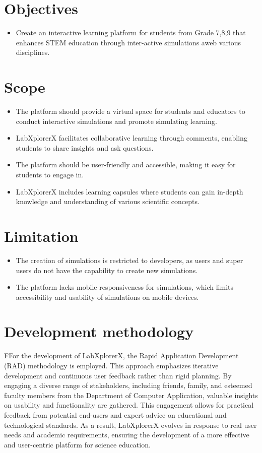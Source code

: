 \section{Objectives}
\begin{itemize}
    \item Create an interactive learning platform for students from Grade 7,8,9 that enhances STEM education through inter-active simulations aweb various disciplines.

\end{itemize}
\section{Scope}

\begin{itemize}
    \item The platform should provide a virtual space for students and educators to conduct interactive simulations and promote simulating learning.
    \item LabXplorerX facilitates collaborative learning through comments, enabling students to share insights and ask questions.
    \item The platform should be user-friendly and accessible, making it easy for students to engage in.
    \item LabXplorerX includes learning capsules where students can gain in-depth knowledge and understanding of various scientific concepts.
\end{itemize}
\section{Limitation}

\begin{itemize} 
    \item The creation of simulations is restricted to developers, as users and super users do not have the capability to create new simulations. 
    \item The platform lacks mobile responsiveness for simulations, which limits accessibility and usability of simulations on mobile devices. 
\end{itemize}

\section{Development methodology}
FFor the development of LabXplorerX, the Rapid Application Development (RAD) methodology is employed. This approach emphasizes iterative development and continuous user feedback rather than rigid planning. By engaging a diverse range of stakeholders, including friends, family, and esteemed faculty members from the Department of Computer Application, valuable insights on usability and functionality are gathered. This engagement allows for practical feedback from potential end-users and expert advice on educational and technological standards. As a result, LabXplorerX evolves in response to real user needs and academic requirements, ensuring the development of a more effective and user-centric platform for science education.

